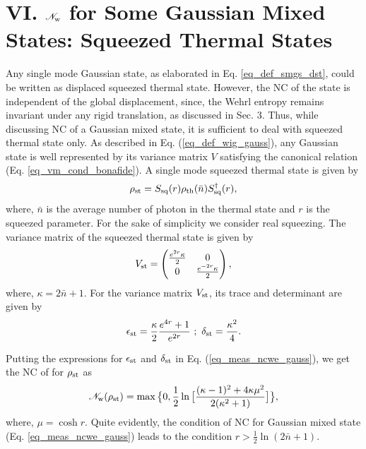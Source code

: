 \documentclass[letter,scriptaddress,twocolumn,prl,showkeys]{revtex4}
\begin{document}
\section*{VI. $\mathscr{N}_{\rm{w}}$ for Some Gaussian Mixed States: Squeezed Thermal States}

Any single mode Gaussian state, as elaborated in Eq. \ref{eq_def_smgs_dst}, could be written as displaced squeezed thermal state.
However, the NC of the state is independent of the global displacement, since, the Wehrl entropy remains invariant under any rigid translation, as discussed in Sec. 3.
Thus, while discussing NC of a Gaussian mixed state, it is sufficient to deal with squeezed thermal state only.
As described in Eq. (\ref{eq_def_wig_gauss}), any Gaussian state is well represented by its variance matrix $V$ satisfying the canonical relation (Eq. \ref{eq_vm_cond_bonafide}). 
A single mode squeezed thermal state is given by
\begin{equation}
\rho_{\rm{st}}= S_{\rm{sq}}(r) \rho_{\rm{th}}(\bar{n}) S^{\dagger}_{\rm{sq}}(r),
\label{eq_rho_st}
\end{equation}
where, $\bar{n}$ is the average number of photon in the thermal state and $r$ is the squeezed parameter.
For the sake of simplicity we consider real squeezing. 
The variance matrix of the squeezed thermal state is given by
\begin{equation}
V_{\rm{st}} = \begin{pmatrix}
\frac{e^{2r}\kappa}{2} & 0\\
0 & \frac{e^{-2r}\kappa}{2}
\end{pmatrix},
\label{eq_vm_st}
\end{equation}
where, $\kappa = 2\bar{n} + 1$.
For the variance matrix $V_{\rm{st}}$, its trace and determinant are given by
\begin{equation}
\epsilon_{\rm{st}} = \frac{\kappa}{2} \frac{e^{4r} + 1}{e^{2r}}~;~\delta_{\rm{st}} = \frac{\kappa^{2}}{4}.
\label{eq_epsilon_delta_st}
\end{equation}

Putting the expressions for $\epsilon_{\rm{st}}$ and $\delta_{\rm{st}}$ in Eq. (\ref{eq_meas_ncwe_gauss}), we get the NC of for $\rho_{\rm{st}}$ as
\begin{equation}
\mathscr{N}_{\rm{w}}(\rho_{\rm{st}}) = \max\big\lbrace 0, \frac{1}{2} \ln \big[\frac{(\kappa - 1)^{2} + 4 \kappa \mu^{2}}{2(\kappa^{2} + 1)} \big] \big\rbrace,
\label{eq_meas_ncwe_st}
\end{equation}
where, $\mu = \cosh r$.
Quite evidently, the condition of NC for Gaussian mixed state (Eq. \ref{eq_meas_ncwe_gauss}) leads to the condition $r>\frac{1}{2} \ln (2\bar{n}+1)$.
\end{document}
